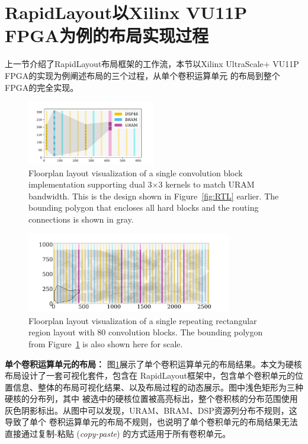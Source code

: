 \section{RapidLayout以Xilinx VU11P FPGA为例的布局实现过程}
\label{sec:visual}

上一节介绍了RapidLayout布局框架的工作流，本节以Xilinx UltraScale+ VU11P FPGA的实现为例阐述布局的三个过程，从单个卷积运算单元
的布局到整个FPGA的完全实现。


\begin{figure}
\centering
\includegraphics[width=0.5\textwidth, valign=c]{figure/block1.pdf}
\caption{Floorplan layout visualization of a single convolution block
implementation supporting dual 3$\times$3 kernels to match URAM bandwidth. This
is the design shown in Figure~\ref{fig:RTL} earlier. The
bounding polygon that encloses all hard blocks and the routing connections is
shown in gray.}
\label{fig:block1}	
\end{figure}

\begin{figure}
\centering
\includegraphics[width=0.8\textwidth, valign=c]{figure/block80.pdf}
\caption{Floorplan layout visualization of a single repeating rectangular region
 layout with 80 convolution blocks. The bounding polygon from
Figure~\ref{fig:block1} is also shown here for scale.}
\label{fig:block80}	
\end{figure}


{\bf 单个卷积运算单元的布局：} 图\ref{fig:block1}展示了单个卷积运算单元的布局结果。本文为硬核布局设计了一套可视化套件，包含在
RapidLayout框架中，包含单个卷积单元的位置信息、整体的布局可视化结果、以及布局过程的动态展示。图中浅色矩形为三种硬核的分布列，其中
被选中的硬核位置被高亮标出，整个卷积核的分布范围使用灰色阴影标出。从图中可以发现，URAM、BRAM、DSP资源列分布不规则，这导致了单个
卷积运算单元的布局不规则，也说明了单个卷积单元的布局结果无法直接通过复制-粘贴 (\textit{copy-paste}) 的方式适用于所有卷积单元。

